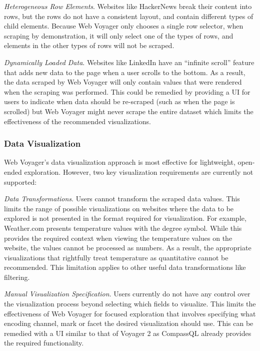 \documentclass{vgtc}                          %
\begin{document}
\emph{Heterogeneous Row Elements}. Websites like HackerNews break their content into rows, but the rows do
not have a consistent layout, and contain different types of child
elements. Because Web Voyager only chooses a single row selector, when
scraping by demonstration, it will only select one of the types of rows,
and elements in the other types of rows will not be scraped.

\emph{Dynamically Loaded Data}. Websites like LinkedIn have an ``infinite scroll'' feature that adds new
data to the page when a user scrolls to the bottom. As a result, the
data scraped by Web Voyager will only contain values that were rendered
when the scraping was performed. This could be remedied by providing a UI for users
to indicate when data should be re-scraped (such as when the page is scrolled) but Web Voyager
might never scrape the entire dataset which limits the effectiveness of the recommended visualizations.

\subsubsection{Data Visualization}

Web Voyager's data visualization approach is most effective for
lightweight, open-ended exploration. However, two key visualization 
requirements are currently not supported:

\emph{Data Transformations}. Users cannot transform the scraped data values. This limits the range of possible visualizations on
websites where the data to be explored is not presented in the format required for visualization. For example, Weather.com presents
temperature values with the degree symbol. While this provides the required context when viewing the temperature values on the website, the
values cannot be processed as numbers. As a result, the appropriate visualizations that rightfully treat temperature as quantitative cannot be recommended.
This limitation applies to other useful data transformations like filtering.

\emph{Manual Visualization Specification}. Users currently do not have any control over the visualization process
beyond selecting which fields to visualize. This limits the
effectiveness of Web Voyager for focused exploration that involves
specifying what encoding channel, mark or facet the desired
visualization should use. This can be remedied with a UI similar to that
of Voyager 2 \cite{wongsuphasawat2017} as CompassQL \cite{wongsuphasawat2016} already provides the required functionality.
\end{document}
